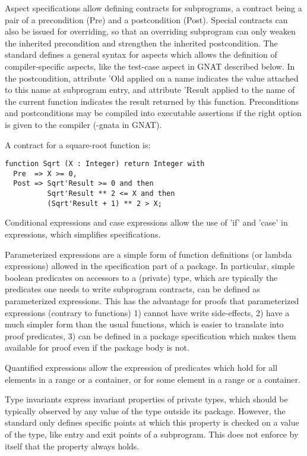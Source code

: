 \documentclass[fullpage]{article}
\newcounter{example}
\newenvironment{example}[1][EXAMPLE]{%
\par
\refstepcounter{example}%
\SpecialEnv{#1}{exampleborder}{examplebg}{}{\theexample}%
}{%
\endSpecialEnv
}
\begin{document}
Aspect specifications allow defining contracts for subprograms, a contract
being a pair of a precondition (Pre) and a postcondition (Post). Special
contracts can also be issued for overriding, so that an overriding subprogram
can only weaken the inherited precondition and strengthen the inherited
postcondition. The standard defines a general syntax for aspects which allows
the definition of compiler-specific aspects, like the test-case aspect in GNAT
described below. In the postcondition, attribute 'Old applied on a name
indicates the value attached to this name at subprogram entry, and attribute
'Result applied to the name of the current function indicates the result
returned by this function. Preconditions and postconditions may be compiled
into executable assertions if the right option is given to the compiler (-gnata
in GNAT).  

\begin{example}
A contract for a square-root function is:
\begin{verbatim}
function Sqrt (X : Integer) return Integer with
  Pre  => X >= 0,
  Post => Sqrt'Result >= 0 and then
          Sqrt'Result ** 2 <= X and then
          (Sqrt'Result + 1) ** 2 > X;
\end{verbatim}
\end{example}

Conditional expressions and case expressions allow the use of 'if' and 'case'
in expressions, which simplifies specifications.

Parameterized expressions are a simple form of function definitions (or lambda
expressions) allowed in the specification part of a package. In particular,
simple boolean predicates on accessors to a (private) type, which are typically
the predicates one needs to write subprogram contracts, can be defined as
parameterized expressions. This has the advantage for proofs that parameterized
expressions (contrary to functions) 1) cannot have write side-effects, 2) have
a much simpler form than the usual functions, which is easier to translate into
proof predicates, 3) can be defined in a package specification which makes them
available for proof even if the package body is not.

Quantified expressions allow the expression of predicates which hold for all
elements in a range or a container, or for some element in a range or a
container.

Type invariants express invariant properties of private types, which should be
typically observed by any value of the type outside its package. However, the
standard only defines specific points at which this property is checked on a
value of the type, like entry and exit points of a subprogram. This does not
enforce by itself that the property always holds.
\end{document}

